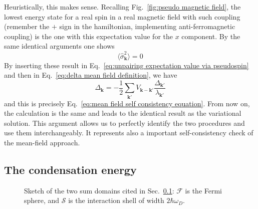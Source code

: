 Heuristically, this makes sense. Recalling Fig.~\ref{fig:pseudo magnetic field}, the lowest energy state for a real spin in a real magnetic field with such coupling (remember the $+$ sign in the hamiltonian, implementing anti-ferromagnetic coupling) is the one with this expectation value for the $x$ component. By the same identical arguments one shows
\[
	\big\langle \hat{\sigma}_\mathbf{k}^2 \big\rangle = 0
\]
By inserting these result in Eq.~\eqref{eq:unpairing expectation value via pseudospin} and then in Eq.~\eqref{eq:delta mean field definition}, we have
\[
	\Delta_\mathbf{k} = - \frac{1}{2} \sum_{\mathbf{k}'} V_{\mathbf{k}-\mathbf{k}'}  \frac{\Delta_{\mathbf{k}'}}{\lambda_{\mathbf{k}'}}
\]
and this is precisely Eq.~\eqref{eq:mean field self consistency equation}. From now on, the calculation is the same and leads to the identical result as the variational solution. This argument allows us to perfectly identify the two procedures and use them interchangeably. It represents also a important self-consistency check of the mean-field approach.

\subsection{The condensation energy}\label{subsec:the condensation energy}

\begin{figure}
	\centering
	
	\caption{Sketch of the two sum domains cited in Sec.~\ref{subsec:the condensation energy}: $\mathcal{F}$ is the Fermi sphere, and $\mathcal{S}$ is the interaction shell of width $2\hbar\omega_D$.}
	\label{fig:sphere integration domains}
\end{figure}

